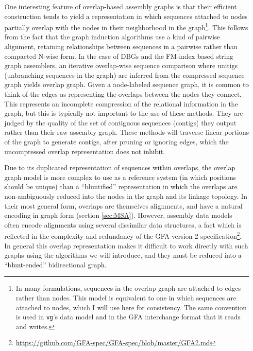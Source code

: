 One interesting feature of overlap-based assembly graphs is that their efficient construction tends to yield a representation in which sequences attached to nodes partially overlap with the nodes in their neighborhood in the graph\footnote{In many formulations, sequences in the overlap graph are attached to edges rather than nodes. This model is equivalent to one in which sequences are attached to nodes, which I will use here for consistency. The same convention is used in {\tt vg}'s data model and in the GFA interchange format that it reads and writes.}.
This follows from the fact that the graph induction algorithms use a kind of pairwise alignment, retaining relationships between sequences in a pairwise rather than compacted N-wise form.
In the case of DBGs and the FM-index based string graph assemblers, an iterative overlap-wise sequence comparison where unitigs (unbranching sequences in the graph) are inferred from the compressed sequence graph yields overlap graph.
Given a node-labeled sequence graph, it is common to think of the edges as representing the overlaps between the nodes they connect.
This represents an incomplete compression of the relational information in the graph, but this is typically not important to the use of these methods.
They are judged by the quality of the set of contiguous sequences (contigs) they output rather than their raw assembly graph.
These methods will traverse linear portions of the graph to generate contigs, after pruning or ignoring edges, which the uncompressed overlap representation does not inhibit.

Due to its duplicated representation of sequences within overlaps, the overlap graph model is more complex to use as a reference system (in which positions should be unique) than a ``bluntified'' representation in which the overlaps are non-ambiguously reduced into the nodes in the graph and its linkage topology.
In their most general form, overlaps are themselves alignments, and have a natural encoding in graph form (section \ref{sec:MSA}).
However, assembly data models often encode alignments using several dissimilar data structures, a fact which is reflected in the complexity and redundancy of the GFA version 2 specification\footnote{\url{https://github.com/GFA-spec/GFA-spec/blob/master/GFA2.md}}.
In general this overlap representation makes it difficult to work directly with such graphs using the algorithms we will introduce, and they must be reduced into a ``blunt-ended'' bidirectional graph.


